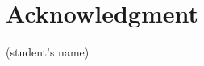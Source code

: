 \cleardoublepage
\chapter*{\centering Acknowledgment}
\lipsum[1]

\lipsum[2]

\begin{flushright}
(student's name)
\end{flushright}